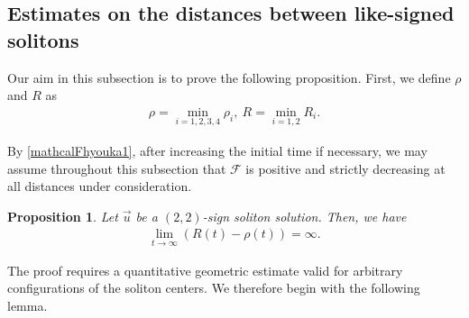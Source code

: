 \documentclass[reqno]{amsart}
\theoremstyle{plain}
\newtheorem{proposition}[theorem]{Proposition}
\theoremstyle{definition}
\numberwithin{equation}{section}
\begin{document}
\subsection{Estimates on the distances between like-signed solitons}

Our aim in this subsection is to prove the following proposition. First, we define $\rho$ and $R$ as 
\begin{align}\label{rhoRdef}
\rho=\min_{i=1,2,3,4}\rho_i,\ R=\min_{i=1,2}R_i.
\end{align}

By \eqref{mathcalFhyouka1}, after increasing the initial time if necessary, we may assume throughout this subsection that
$\mathcal{F}$ is positive and strictly decreasing at all distances under consideration.


\begin{proposition}\label{samesolitonhanare}
Let $\vec{u}$ be a $(2,2)$-sign soliton solution. Then, we have
\begin{align}\label{taikakusengomi}
\lim_{t\to\infty}\left(R(t)-\rho(t)\right)=\infty.
\end{align}
\end{proposition}

The proof requires a quantitative geometric estimate valid for arbitrary configurations of the soliton centers. We therefore begin with the following lemma.
\end{document}
